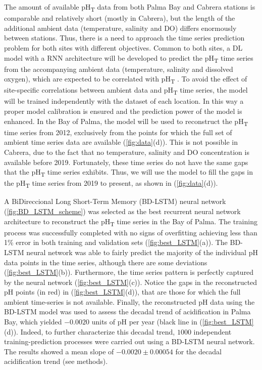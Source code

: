 The amount of available pH\textsubscript{T} data from both Palma Bay and
Cabrera stations is comparable and relatively short (mostly in Cabrera), but
the length of the additional ambient data (temperature, salinity and DO)
differs enormously between stations. Thus, there is a need to approach the time
series prediction problem for both sites with different objectives. Common to
both sites, a DL model with a RNN architecture will be developed to predict the
pH\textsubscript{T} time series from the accompanying ambient data
(temperature, salinity and dissolved oxygen), which are expected to be
correlated with pH\textsubscript{T} \cite{Fourrier2020,Broullon2021}. To avoid
the effect of site-specific correlations between ambient data and
pH\textsubscript{T} time series, the model will be trained independently with
the dataset of each location. In this way a proper model calibration is ensured
and the prediction power of the model is enhanced. In the Bay of Palma, the
model will be used to reconstruct the pH\textsubscript{T} time series from
2012, exclusively from the points for which the full set of ambient time series
data are available (\cref{fig:data}(d)). This is not possible in Cabrera, due
to the fact that no temperature, salinity and DO concentration is available
before 2019. Fortunately, these time series do not have the same gaps that the
pH\textsubscript{T} time series exhibits. Thus, we will use the model to fill
the gaps in the pH\textsubscript{T} time series from 2019 to present, as shown
in (\cref{fig:data}(d)).

A BiDireccional Long Short-Term Memory (BD-LSTM) neural network
(\cref{fig:BD_LSTM_scheme}) was selected as the best recurrent neural network
architecture to reconstruct the pH\textsubscript{T} time series in the Bay of
Palma. The training process was successfully completed with no signs of
overfitting achieving less than 1\% error in both training and validation sets
(\cref{fig:best_LSTM}(a)). The BD-LSTM neural network was able to fairly
predict the majority of the individual pH data points in the time series,
although there are some deviations (\cref{fig:best_LSTM}(b)). Furthermore, the
time series pattern is perfectly captured by the neural network
(\cref{fig:best_LSTM}(c)). Notice the gaps in the reconstructed pH points (in
red) in (\cref{fig:best_LSTM}(d)), that are those for which the full ambient
time-series is not available. Finally, the reconstructed pH data using the
BD-LSTM model was used to assess the decadal trend of acidification in Palma
Bay, which yielded $-0.0020$ units of pH per year (black line in
(\cref{fig:best_LSTM}(d)). Indeed, to further characterize this decadal trend,
$1000$ independent training-prediction processes were carried out using a
BD-LSTM neural network. The results showed a mean slope of  $-0.0020 \pm
    0.00054$ for the decadal acidification trend (see methods).

